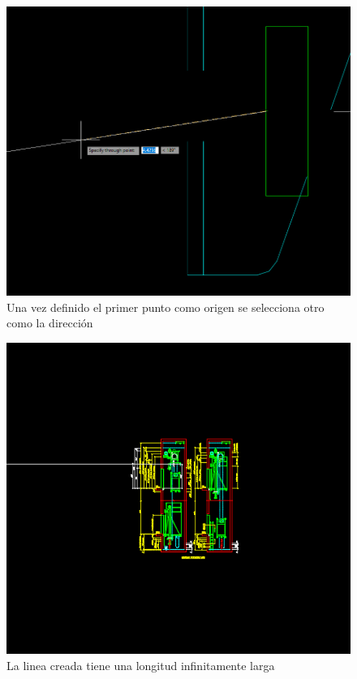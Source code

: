 \documentclass{report}
\begin{document}
\begin{figure}[H]
	\centering
	\includegraphics[width=0.75\linewidth, height=0.5\textheight,keepaspectratio]{Imagenes/autocad_ray02}
	\caption{Una vez definido el primer punto como origen se selecciona otro como la dirección}
	\label{fig:autocadray02}
\end{figure}

\begin{figure}[H]
	\centering
	\includegraphics[width=0.85\linewidth, height=0.5\textheight,keepaspectratio]{Imagenes/autocad_ray03}
	\caption{La linea creada tiene una longitud infinitamente larga}
	\label{fig:autocadray03}
\end{figure}
\end{document}
